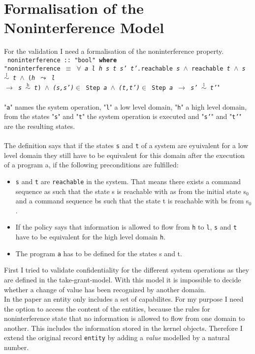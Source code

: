 \chapter{Formalisation of the Noninterference Model}\label{FormNon}
For the validation I need a formalisation of the noninterference property. \\ 

{
\texttt{
noninterference :: "bool" \textbf{where} \\
"noninterference $\equiv$ $\forall$ \textit{a l h s t s' t'.}reachable \textit{s} $\wedge$ reachable \textit{t} $\wedge$ \textit{s $\overset{\text{l}}{\sim}$ t} $\wedge$ (\textit{h $\leadsto$ l \\
$\longrightarrow$ s $\overset{\text{h}}{\sim}$ t}) $\wedge$ \textit{(s,s')}$\in$ Step \textit{a} $\wedge$ \textit{(t,t')}$\in$ Step \textit{a} $\longrightarrow$ \textit{s' $\overset{\text{l}}{\sim}$ t'}}"} \\ \\
"\texttt{a}" names the system operation, "\texttt{l}" a low level domain, "\texttt{h}" a high level domain, from the states "\texttt{s}" and "\texttt{t}" the system operation is executed and "\texttt{s'}" and "\texttt{t'}" are the resulting states. \\ \\
The definition says that if the states \texttt{s} and \texttt{t} of a system are eyuivalent for a low level domain they still have to be equivalent for this domain after the execution of a program a, if the following preconditions are fulfilled: 
\begin{itemize}
\item \texttt{s} and \texttt{t} are \texttt{reachable} in the system. That means there exists a command sequence as such that the state s is reachable with as from the initial state s$_0$ and a command sequence bs such that the state t is reachable with bs from s$_0$.
\item If the policy says that information is allowed to flow from \texttt{h} to \texttt{l}, \texttt{s} and \texttt{t} have to be equivalent for the high level domain \texttt{h}.
\item The program \texttt{a} has to be defined for the states s and t.
\end{itemize} 
First I tried to validate confidentiality for the different system operations as they are defined in the take-grant-model. With this model it is impossible to decide whether a change of value has been recognized by another domain. \\
In the paper an entity only includes a set of capabilites. For my purpose I need the option to access the content of the entities, because the rules for noninterference state that no information is allowed to flow from one domain to another. This includes the information stored in the kernel objects. 
Therefore I extend the original record \texttt{entity} by adding a \textit{value} modelled by a natural number. \\ 

